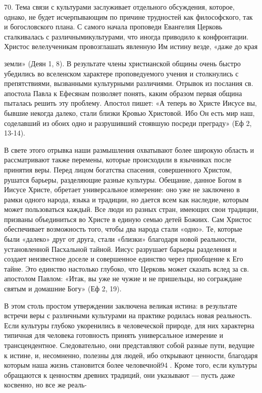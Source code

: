 \documentclass[a5paper,10pt]{article}
\begin{document}
70. Тема связи с культурами заслуживает отдельного обсуждения, которое, однако,
не будет исчерпывающим по причине трудностей как философского, так и
богословского плана. С самого начала проповеди Евангелия Церковь сталкивалась с
различнымикультурами, что иногда приводило к конфронтации. Христос
велелученикам провозглашать явленную Им истину везде, «даже до края

земли» (Деян 1, 8). В результате члены христианской общины очень быстро
убедились во вселенском характере проповедуемого учения и столкнулись с
препятствиями, вызванными культурными различиями. Отрывок из послания св.
апостола Павла к Ефесянам позволяет понять, каким образом первая община
пыталась решить эту проблему. Апостол пишет: «А теперь во Христе Иисусе вы,
бывшие некогда далеко, стали близки Кровью Христовой. Ибо Он есть мир наш,
соделавший из обоих одно и разрушивший стоявшую посреди преграду» (Еф 2,
13-14).

В свете этого отрывка наши размышления охватывают более широкую область и
рассматривают также перемены, которые происходили в язычниках после принятия
веры. Перед лицом богатства спасения, совершенного Христом, рушатся барьеры,
разделяющие разные культуры. Обещание, данное Богом в Иисусе Христе, обретает
универсальное измерение: оно уже не заключено в рамки одного народа, языка и
традиции, но дается всем как наследие, которым может пользоваться каждый. Все
люди из разных стран, имеющих свои традиции, призваны объединиться во Христе в
единую семью детей Божиих. Сам Христос обеспечивает возможность того, чтобы два
народа стали «одно». Те, которые были «далеко» друг от друга, стали «близки»
благодаря новой реальности, установленной Пасхальной тайной. Иисус разрушает
барьеры разделения и создает неизвестное доселе и совершенное единство через
приобщение к Его тайне. Это единство настолько глубоко, что Церковь может
сказать вслед за св. апостолом Павлом: «Итак, вы уже не чужие и не пришельцы,
но сограждане святым и домашние Богу» (Еф 2, 19).

В этом столь простом утверждении заключена великая истина: в результате встречи
веры с различными культурами на практике родилась новая реальность. Если
культуры глубоко укоренились в человеческой природе, для них характерна
типичная для человека готовность принять универсальное измерение и
трансцендентное. Следовательно, они представляют собой разные пути, ведущие к
истине, и, несомненно, полезны для людей, ибо открывают ценности, благодаря
которым наша жизнь становится более человечной94 . Кроме того, если культуры
обращаются к ценностям древних традиций, они указывают — пусть даже косвенно,
но все же реаль-
\end{document}
